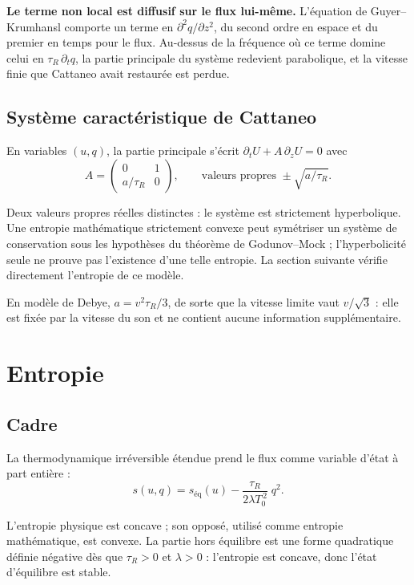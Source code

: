 \documentclass[11pt,a4paper]{article}
\begin{document}
\textbf{Le terme non local est diffusif sur le flux lui-même.} L'équation de Guyer--Krumhansl
comporte un terme en $\partial^2 q / \partial z^2$, du second ordre en espace et du premier en temps
pour le flux. Au-dessus de la fréquence où ce terme domine celui en $\tau_R\,\partial_t q$, la partie
principale du système redevient parabolique, et la vitesse finie que Cattaneo avait restaurée est
perdue.

\subsection{Système caractéristique de Cattaneo}

En variables $(u, q)$, la partie principale s'écrit $\partial_t U + A\,\partial_z U = 0$ avec
\[ A = \begin{pmatrix} 0 & 1 \\[2pt] a/\tau_R & 0 \end{pmatrix} ,
\qquad \text{valeurs propres } \pm\sqrt{a/\tau_R} . \]

Deux valeurs propres réelles distinctes : le système est strictement hyperbolique. Une entropie mathématique strictement convexe peut symétriser un système de conservation sous les hypothèses du théorème de Godunov--Mock ; l'hyperbolicité seule ne prouve pas l'existence d'une telle entropie. La section suivante vérifie directement l'entropie de ce modèle.

En modèle de Debye, $a = v^2\tau_R/3$, de sorte que la vitesse limite vaut $v/\sqrt{3}$ : elle est
fixée par la vitesse du son et ne contient aucune information supplémentaire.

\section{Entropie}

\subsection{Cadre}

La thermodynamique irréversible étendue prend le flux comme variable d'état à part entière :
\[ s(u, q) = s_{\mathrm{éq}}(u) - \frac{\tau_R}{2\lambda T_0^{\,2}}\;q^2 . \]

L'entropie physique est concave ; son opposé, utilisé comme entropie mathématique,
est convexe. La partie hors équilibre est une forme quadratique définie négative dès que $\tau_R > 0$ et
$\lambda > 0$ : l'entropie est concave, donc l'état d'équilibre est stable.
\end{document}
